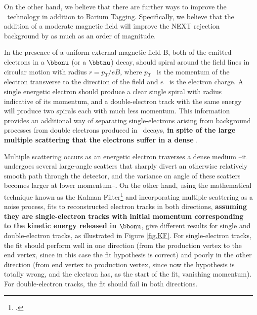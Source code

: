 On the other hand, we believe that there are further ways to improve the \HPXE\ technology in addition to Barium Tagging. Specifically, we believe that the addition of a moderate magnetic field will improve the NEXT rejection background by as much as an order of magnitude. 

In the presence of a uniform external magnetic field B, both of the emitted electrons in a $\bbonu$ (or a $\bbtnu$) decay, should spiral around the field lines in circular motion with radius $r = p_T/eB$, where $p_T$~ is the momentum of the electron transverse to the direction of the field and $e$~ is the electron charge. A single energetic electron should produce a clear single spiral with radius indicative of its momentum, and a double-electron track with the same energy will produce two spirals each with much less momentum. This information provides an additional way of separating single-electrons arising from background processes from double electrons produced in \bb\ decays, {\bf in spite of the large multiple scattering that the electrons suffer in a dense \HPXE}.

Multiple scattering occurs as an energetic electron traverses a dense medium --it undergoes several large-angle scatters that sharply divert an otherwise relatively smooth path through the detector, and the variance on angle of these scatters becomes larger at lower momentum--. On the other hand, using the mathematical technique known as the Kalman Filter\footcite{Cervera:2002} and incorporating multiple scattering as a noise process, fits to reconstructed electron tracks in both directions, {\bf assuming they are single-electron tracks with initial momentum corresponding to the kinetic energy released in $\bbonu$},  give different results for single and double-electron tracks, as illustrated in Figure \ref{fig.KF}. For single-electron tracks, the fit should perform well in one direction (from the production vertex to the end vertex, since in this case the fit hypothesis is correct) and poorly in the other direction (from end vertex to production vertex, since now the hypothesis is totally wrong, and the electron has, as the start of the fit, vanishing momentum). For double-electron tracks, the fit should fail in both directions. 

